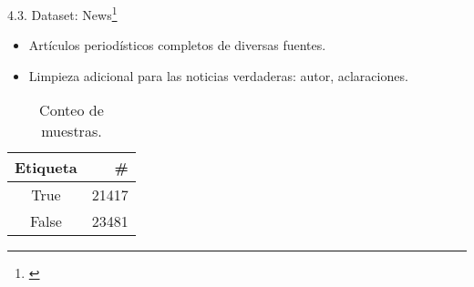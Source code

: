 \begin{frame}{4.3. Dataset: News\footnote{\citep{Ahmed2017}}}

\begin{itemize}
    \item Artículos periodísticos completos de diversas fuentes.
    \item Limpieza adicional para las noticias verdaderas: autor, aclaraciones.
\end{itemize}


\vspace{2ex}

\begin{table}
    \centering
    \begin{tabular}{cr}
        \hline
        \textbf{Etiqueta} & \textbf{\#} \\ \hline
        {True} & {21417} \\ \hline
        {False} & {23481} \\
        \hline
    \end{tabular}
    \caption{Conteo de muestras.}
\end{table}

\end{frame}




